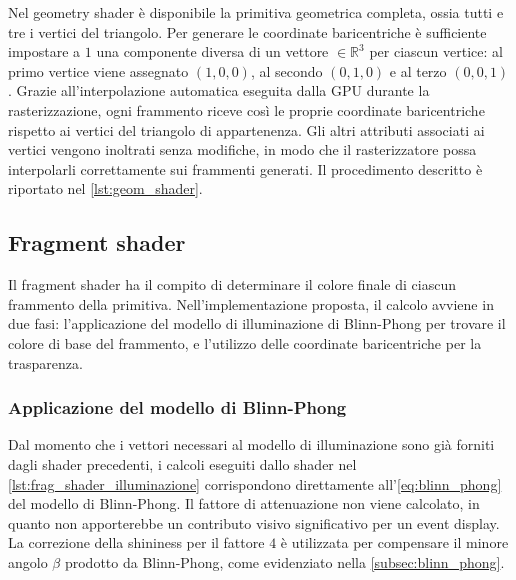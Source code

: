 Nel geometry shader è disponibile la primitiva geometrica completa, ossia tutti e tre i vertici del triangolo.
Per generare le coordinate baricentriche è sufficiente impostare a $1$ una componente diversa di un vettore $\in \mathbb{R}^3$ per ciascun vertice: al primo vertice viene assegnato $(1, 0, 0)$, al secondo $(0, 1, 0)$ e al terzo $(0, 0, 1)$.
Grazie all'interpolazione automatica eseguita dalla GPU durante la rasterizzazione, ogni frammento riceve così le proprie coordinate baricentriche rispetto ai vertici del triangolo di appartenenza.
Gli altri attributi associati ai vertici vengono inoltrati senza modifiche, in modo che il rasterizzatore possa interpolarli correttamente sui frammenti generati.
Il procedimento descritto è riportato nel \cref{lst:geom_shader}.



\subsection{Fragment shader}
Il fragment shader ha il compito di determinare il colore finale di ciascun frammento della primitiva.
Nell'implementazione proposta, il calcolo avviene in due fasi: l'applicazione del modello di illuminazione di Blinn-Phong per trovare il colore di base del frammento, e l'utilizzo delle coordinate baricentriche per la trasparenza.

\subsubsection{Applicazione del modello di Blinn-Phong}
Dal momento che i vettori necessari al modello di illuminazione sono già forniti dagli shader precedenti, i calcoli eseguiti dallo shader nel \cref{lst:frag_shader_illuminazione} corrispondono direttamente all'\cref{eq:blinn_phong} del modello di Blinn-Phong.
Il fattore di attenuazione non viene calcolato, in quanto non apporterebbe un contributo visivo significativo per un event display.
La correzione della shininess per il fattore $4$ è utilizzata per compensare il minore angolo $\beta$ prodotto da Blinn-Phong, come evidenziato nella \cref{subsec:blinn_phong}.

